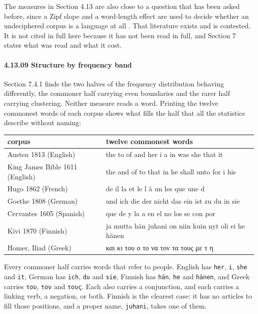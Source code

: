 The measures in Section 4.13 are also close to a question that has been asked before, since a Zipf slope and a word-length effect are used to decide whether an undeciphered corpus is a language at all \cite{src:Sproat}. That literature exists and is contested. It is not cited in full here because it has not been read in full, and Section 7 states what was read and what it cost.

\paragraph{4.13.09 Structure by frequency band}

Section 7.4.1 finds the two halves of the frequency distribution behaving differently, the commoner half carrying even boundaries and the rarer half carrying clustering. Neither measure reads a word. Printing the twelve commonest words of each corpus shows what fills the half that all the statistics describe without naming:


\tiny
\setlength{\tabcolsep}{2pt}
\begin{longtable}{@{}>{\raggedright\arraybackslash}p{}>{\raggedright\arraybackslash}p{}@{}}
\toprule
corpus & twelve commonest words \\
\midrule
Austen 1813 (English) & the to of and her i a in was she that it \\
King James Bible 1611 (English) & the and of to that in he shall unto for i his \\
Hugo 1862 (French) & de il la et le l à un les que une d \\
Goethe 1808 (German) & und ich die der nicht das ein ist zu du in sie \\
Cervantes 1605 (Spanish) & que de y la a en el no los se con por \\
Kivi 1870 (Finnish) & ja mutta hän juhani on niin kuin nyt oli ei he hänen \\
Homer, Iliad (Greek) & και κι του ο το να τον τα τους με τ η \\
\bottomrule
\end{longtable}
\normalsize

Every commoner half carries words that refer to people. English has \texttt{her}, \texttt{i}, \texttt{she} and \texttt{it}, German has \texttt{ich}, \texttt{du} and \texttt{sie}, Finnish has \texttt{hän}, \texttt{he} and \texttt{hänen}, and Greek carries \texttt{του}, \texttt{τον} and \texttt{τους}. Each also carries a conjunction, and each carries a linking verb, a negation, or both. Finnish is the clearest case: it has no articles to fill those positions, and a proper name, \texttt{juhani}, takes one of them.

